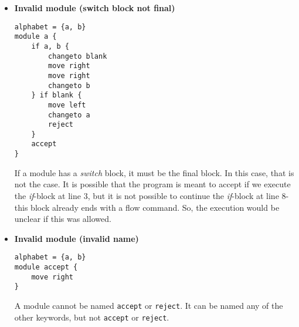 \begin{itemize}
    \item \textbf{Invalid module (switch block not final)}
\begin{lstlisting}[language=TML]
alphabet = {a, b}
module a {
    if a, b {
        changeto blank
        move right
        move right
        changeto b
    } if blank {
        move left
        changeto a
        reject
    }
    accept
}
\end{lstlisting}
    If a module has a \textit{switch} block, it must be the final block. In this case, that is not the case. It is possible that the program is meant to accept if we execute the \textit{if}-block at line 3, but it is not possible to continue the \textit{if}-block at line 8- this block already ends with a flow command. So, the execution would be unclear if this was allowed.

    \item \textbf{Invalid module (invalid name)}
\begin{lstlisting}[language=TML]
alphabet = {a, b}
module accept {
    move right
}
\end{lstlisting}
    A module cannot be named \texttt{accept} or \texttt{reject}. It can be named any of the other keywords, but not \texttt{accept} or \texttt{reject}.

\end{itemize}

